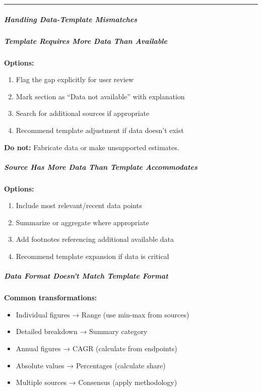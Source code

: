 \documentclass[11pt]{article}
\begin{document}
\vspace{0.5em}\hrule\vspace{0.5em}

\subparagraph{Handling Data-Template Mismatches}\mbox{}\par

\subparagraph{Template Requires More Data Than Available}\mbox{}\par

\textbf{Options:}

\begin{enumerate}[leftmargin=*,itemsep=2pt,topsep=2pt]
\item {} Flag the gap explicitly for user review
\item {} Mark section as ``Data not available'' with explanation
\item {} Search for additional sources if appropriate
\item {} Recommend template adjustment if data doesn't exist
\end{enumerate}

\textbf{Do not:} Fabricate data or make unsupported estimates.


\subparagraph{Source Has More Data Than Template Accommodates}\mbox{}\par

\textbf{Options:}

\begin{enumerate}[leftmargin=*,itemsep=2pt,topsep=2pt]
\item {} Include most relevant/recent data points
\item {} Summarize or aggregate where appropriate
\item {} Add footnotes referencing additional available data
\item {} Recommend template expansion if data is critical
\end{enumerate}

\subparagraph{Data Format Doesn't Match Template Format}\mbox{}\par

\textbf{Common transformations:}

\begin{itemize}[leftmargin=*,itemsep=2pt,topsep=2pt]
\item {} Individual figures → Range (use min-max from sources)
\item {} Detailed breakdown → Summary category
\item {} Annual figures → CAGR (calculate from endpoints)
\item {} Absolute values → Percentages (calculate share)
\item {} Multiple sources → Consensus (apply methodology)
\end{itemize}
\end{document}

